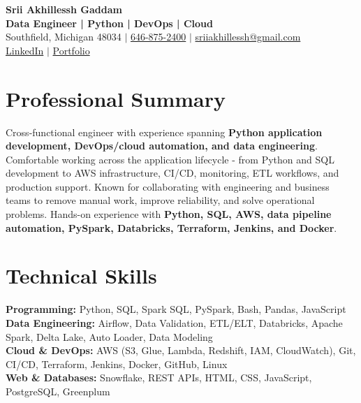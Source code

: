 \documentclass[letterpaper,10pt]{article}
\begin{document}
\fontsize{9.35pt}{10.45pt}\selectfont

\begin{center}
    {\LARGE \textbf{Srii Akhillessh Gaddam}} \\[-1pt]
    \textbf{Data Engineer | Python | DevOps | Cloud} \\[2pt]
    Southfield, Michigan 48034 $|$
    \href{tel:6468752400}{646-875-2400} $|$
    \href{mailto:sriiakhillessh@gmail.com}{sriiakhillessh@gmail.com} \\[1pt]
    \href{https://www.linkedin.com/in/srii-akhiilessh-gaddam-b48668191/}{LinkedIn} $|$
    \href{https://sriiakhillesshg.github.io/portfolio/}{Portfolio}
\end{center}
\vspace{-8pt}

\section{Professional Summary}
\small{Cross-functional engineer with experience spanning \textbf{Python application development, DevOps/cloud automation, and data engineering}. Comfortable working across the application lifecycle - from Python and SQL development to AWS infrastructure, CI/CD, monitoring, ETL workflows, and production support. Known for collaborating with engineering and business teams to remove manual work, improve reliability, and solve operational problems. Hands-on experience with \textbf{Python, SQL, AWS, data pipeline automation, PySpark, Databricks, Terraform, Jenkins, and Docker}.}

\section{Technical Skills}
\small{
\textbf{Programming:} Python, SQL, Spark SQL, PySpark, Bash, Pandas, JavaScript \\
\textbf{Data Engineering:} Airflow, Data Validation, ETL/ELT, Databricks, Apache Spark, Delta Lake, Auto Loader, Data Modeling \\
\textbf{Cloud \& DevOps:} AWS (S3, Glue, Lambda, Redshift, IAM, CloudWatch), Git, CI/CD, Terraform, Jenkins, Docker, GitHub, Linux \\
\textbf{Web \& Databases:} Snowflake, REST APIs, HTML, CSS, JavaScript, PostgreSQL, Greenplum
}

\end{document}

